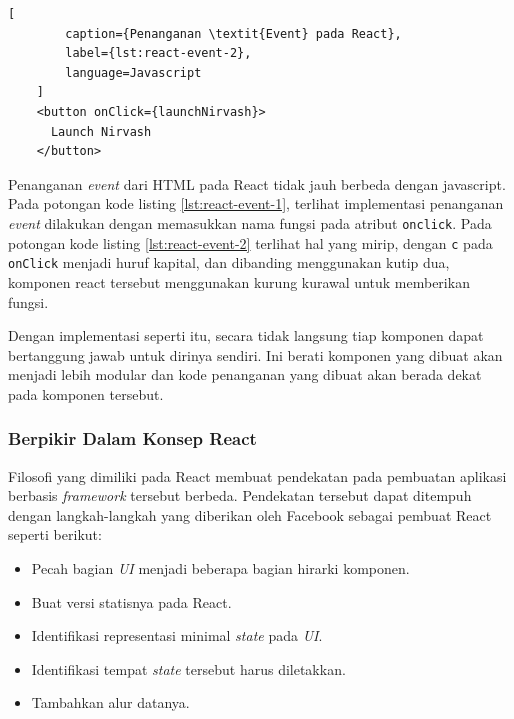     \begin{lstlisting}[
        caption={Penanganan \textit{Event} pada React}, 
        label={lst:react-event-2}, 
        language=Javascript
    ]
    <button onClick={launchNirvash}>
      Launch Nirvash
    </button>
    \end{lstlisting}
    
    Penanganan \textit{event} dari HTML pada React tidak jauh berbeda dengan javascript. Pada potongan kode listing \ref{lst:react-event-1}, terlihat implementasi penanganan \textit{event} dilakukan dengan memasukkan nama fungsi pada atribut \texttt{onclick}. Pada potongan kode listing \ref{lst:react-event-2} terlihat hal yang mirip, dengan \texttt{c} pada \texttt{onClick} menjadi huruf kapital, dan dibanding menggunakan kutip dua, komponen react tersebut menggunakan kurung kurawal untuk memberikan fungsi.
    
    Dengan implementasi seperti itu, secara tidak langsung tiap komponen dapat bertanggung jawab untuk dirinya sendiri. Ini berati komponen yang dibuat akan menjadi lebih modular dan kode penanganan yang dibuat akan berada dekat pada komponen tersebut.
    
    
    \subsubsection{Berpikir Dalam Konsep React}
    Filosofi yang dimiliki pada React membuat pendekatan pada pembuatan aplikasi berbasis \textit{framework} tersebut berbeda. Pendekatan tersebut dapat ditempuh dengan langkah-langkah yang diberikan oleh Facebook sebagai pembuat React\cite{facebook:react-thinking-in-react} seperti berikut:
    
    \begin{itemize}
        \item Pecah bagian \textit{UI} menjadi beberapa bagian hirarki komponen.
        
        \item Buat versi statisnya pada React.
        
        \item Identifikasi representasi minimal \textit{state} pada \textit{UI}.
        
        \item Identifikasi tempat \textit{state} tersebut harus diletakkan.
        
        \item Tambahkan alur datanya.
    \end{itemize}
    
